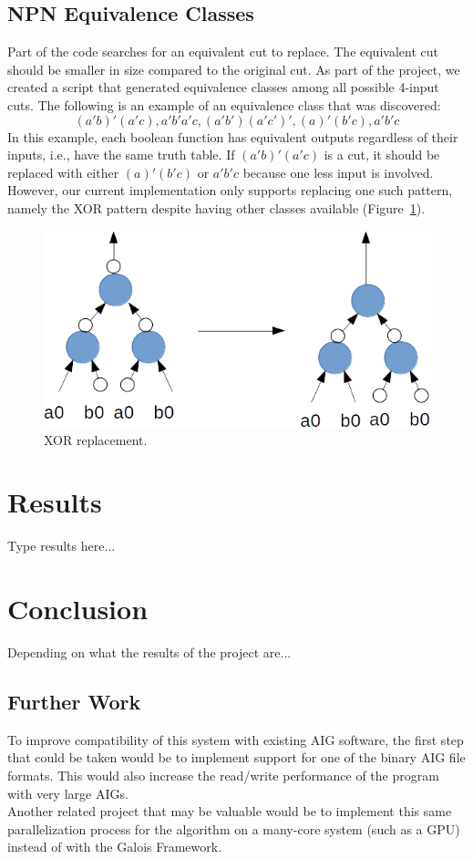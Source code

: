 \documentclass[twocolumn]{article}
\begin{document}
\subsection{NPN Equivalence Classes}
Part of the code searches for an equivalent cut to replace.  The equivalent cut should be smaller in size compared to the original cut.  As part of the project, we created a script that generated equivalence classes among all possible 4-input cuts.  The following is an example of an equivalence class that was discovered:\\
\begin{equation}
(a'b)'(a'c), a'b'a'c, (a'b')(a'c')', (a)'(b'c), a'b'c
\end{equation}
In this example, each boolean function has equivalent outputs regardless of their inputs, i.e., have the same truth table.  If $(a'b)'(a'c)$ is a cut, it should be replaced with either $(a)'(b'c)$ or $a'b'c$ because one less input is involved.  However, our current implementation only supports replacing one such pattern, namely the XOR pattern despite having other classes available (Figure~\ref{fig:Diagram}).

\begin{figure}[t]
\begin{center}
\includegraphics[scale=.5]{Graph.png}
\caption{XOR replacement.}
\label{fig:Diagram}
\end{center}
\end{figure}
\section{Results}
Type results here...
\section{Conclusion}
Depending on what the results of the project are...
\subsection{Further Work}
To improve compatibility of this system with existing AIG software, the first step that could be taken would be to implement support for one of the binary AIG file formats. This would also increase the read/write performance of the program with very large AIGs.\\\indent
Another related project that may be valuable would be to implement this same parallelization process for the algorithm on a many-core system (such as a GPU) instead of with the Galois Framework.


\end{document}
